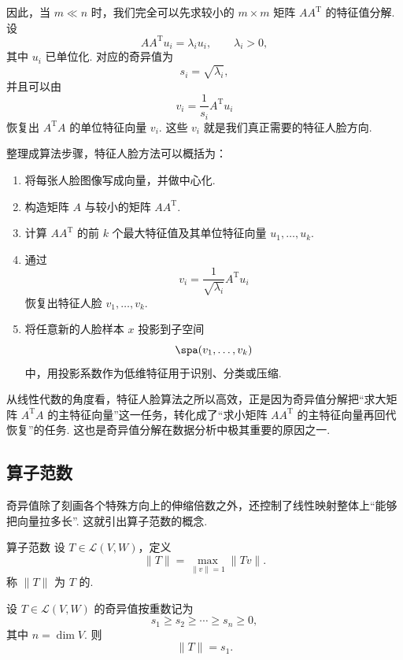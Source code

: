 因此，当 $m \ll n$ 时，我们完全可以先求较小的 $m \times m$ 矩阵 $AA^{\mathrm{T}}$ 的特征值分解. 设
\[
    AA^{\mathrm{T}}u_i = \lambda_i u_i,\qquad \lambda_i > 0,
\]
其中 $u_i$ 已单位化. 对应的奇异值为
\[
    s_i = \sqrt{\lambda_i},
\]
并且可以由
\[
    v_i = \frac{1}{s_i}A^{\mathrm{T}}u_i
\]
恢复出 $A^{\mathrm{T}}A$ 的单位特征向量 $v_i$. 这些 $v_i$ 就是我们真正需要的特征人脸方向.

整理成算法步骤，特征人脸方法可以概括为：
\begin{enumerate}
    \item 将每张人脸图像写成向量，并做中心化.

    \item 构造矩阵 $A$ 与较小的矩阵 $AA^{\mathrm{T}}$.

    \item 计算 $AA^{\mathrm{T}}$ 的前 $k$ 个最大特征值及其单位特征向量 $u_1, \ldots, u_k$.

    \item 通过
          \[
              v_i = \frac{1}{\sqrt{\lambda_i}}A^{\mathrm{T}}u_i
          \]
          恢复出特征人脸 $v_1, \ldots, v_k$.

    \item 将任意新的人脸样本 $x$ 投影到子空间
          \[
              \spa(v_1, \ldots, v_k)
          \]
          中，用投影系数作为低维特征用于识别、分类或压缩.
\end{enumerate}

从线性代数的角度看，特征人脸算法之所以高效，正是因为奇异值分解把“求大矩阵 $A^{\mathrm{T}}A$ 的主特征向量”这一任务，转化成了“求小矩阵 $AA^{\mathrm{T}}$ 的主特征向量再回代恢复”的任务. 这也是奇异值分解在数据分析中极其重要的原因之一.

\subsection*{算子范数}

奇异值除了刻画各个特殊方向上的伸缩倍数之外，还控制了线性映射整体上“能够把向量拉多长”. 这就引出算子范数的概念.

\begin{definition}{算子范数}{} 
    设 $T \in \mathcal{L}(V, W)$，定义
    \[
        \lVert T \rVert = \max_{\lVert v \rVert = 1}\lVert Tv \rVert.
    \]
    称 $\lVert T \rVert$ 为 $T$ 的.
\end{definition}

\begin{theorem}{}{}
    设 $T \in \mathcal{L}(V, W)$ 的奇异值按重数记为
    \[
        s_1 \geqslant s_2 \geqslant \cdots \geqslant s_n \geqslant 0,
    \]
    其中 $n = \dim V$. 则
    \[
        \lVert T \rVert = s_1.
    \]
\end{theorem}

